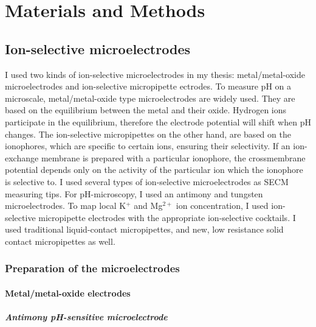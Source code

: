 \chapter{Materials and Methods}
\section{Ion-selective microelectrodes}
I used two kinds of ion-selective microelectrodes in my thesis: metal/metal-oxide microelectrodes and ion-selective micropipette ectrodes.
To measure pH on a microscale, metal/metal-oxide type microelectrodes are widely used.
They are based on the equilibrium between the metal and their oxide.
Hydrogen ions participate in the equilibrium, therefore the electrode potential will shift when pH changes.
The ion-selective micropipettes on the other hand, are based on the ionophores, which are specific to certain ions, ensuring their selectivity.
If an ion-exchange membrane is prepared with a particular ionophore, the crossmembrane potential depends only on the activity of the particular ion which the ionophore is selective to.
I used several types of ion-selective microelectrodes as SECM measuring tips.
For pH-microscopy, I used an antimony and tungsten microelectrodes.
To map local K$^+$ and Mg$^{2+}$ ion concentration, I used ion-selective micropipette electrodes with the appropriate ion-selective cocktails.
I used traditional liquid-contact micropipettes, and new, low resistance solid contact micropipettes as well.
		\subsection{Preparation of the microelectrodes}
			\subsubsection{Metal/metal-oxide electrodes}
				\paragraph{Antimony pH-sensitive microelectrode}


